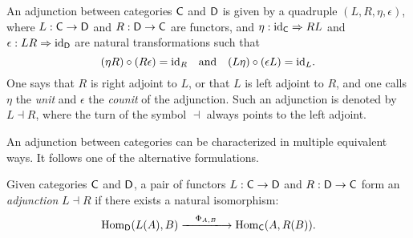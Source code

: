 \begin{definition}
  An adjunction between categories $\mathsf{C}$ and $\mathsf{D}$ is given by a quadruple 
$(L, R, \eta, \epsilon)$, where $L : \mathsf{C} \to \mathsf{D}$ and 
$R : \mathsf{D} \to \mathsf{C}$ are functors, and 
$\eta : \mathrm{id}_{\mathsf{C}} \Rightarrow R L$ and 
$\epsilon : L R \Rightarrow \mathrm{id}_{\mathsf{D}}$ are natural transformations such that
\[
(\eta R) \circ (R \epsilon) = \mathrm{id}_R \quad \text{and} \quad (L \eta) \circ (\epsilon L) = \mathrm{id}_L.
\]
One says that $R$ is right adjoint to $L$, or that $L$ is left adjoint to $R$, and one calls 
$\eta$ the \emph{unit} and $\epsilon$ the \emph{counit} of the adjunction.  Such an adjunction is denoted by $L \dashv R$, where the turn of the symbol $\dashv$ always points to the left adjoint.

An adjunction between categories can be characterized in multiple equivalent ways. It follows one of the alternative formulations. 

Given categories \(\mathsf{C}\) and \(\mathsf{D}\), a pair of functors \(L: \mathsf{C} \to \mathsf{D}\) and \(R: \mathsf{D} \to \mathsf{C} \) form an \emph{adjunction} \(L \dashv R\) if there exists a natural isomorphism:
\[
\mathrm{Hom}_{\catD}(L(A), B) 
\xlongrightarrow{\quad \Phi_{A,B} \quad}
\mathrm{Hom}_{\catC}(A, R(B)).
\]

\end{definition}

